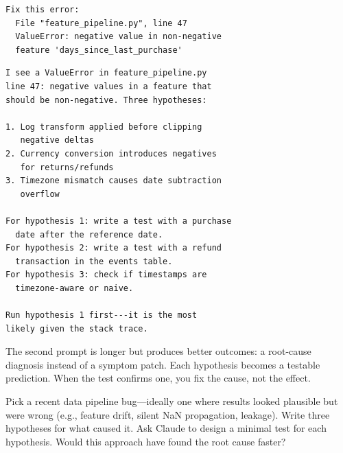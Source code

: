 
\begin{fullwidth}
\begin{beforeafter}[Debugging]
\before
\begin{verbatim}
Fix this error:
  File "feature_pipeline.py", line 47
  ValueError: negative value in non-negative
  feature 'days_since_last_purchase'
\end{verbatim}

\after
\begin{verbatim}
I see a ValueError in feature_pipeline.py
line 47: negative values in a feature that
should be non-negative. Three hypotheses:

1. Log transform applied before clipping
   negative deltas
2. Currency conversion introduces negatives
   for returns/refunds
3. Timezone mismatch causes date subtraction
   overflow

For hypothesis 1: write a test with a purchase
  date after the reference date.
For hypothesis 2: write a test with a refund
  transaction in the events table.
For hypothesis 3: check if timestamps are
  timezone-aware or naive.

Run hypothesis 1 first---it is the most
likely given the stack trace.
\end{verbatim}
\end{beforeafter}
\end{fullwidth}


The second prompt is longer but produces better outcomes: a root-cause
diagnosis instead of a symptom patch. Each hypothesis becomes a testable
prediction. When the test confirms one, you fix the cause, not the effect.



\begin{trybox}
Pick a recent data pipeline bug---ideally one where results looked plausible
but were wrong (e.g., feature drift, silent NaN propagation, leakage).
Write three hypotheses for what caused it.
Ask Claude to design a minimal test for each hypothesis.
Would this approach have found the root cause faster?
\end{trybox}

